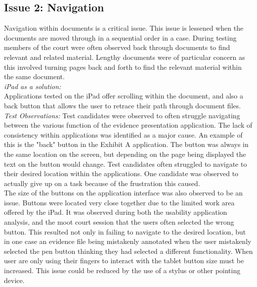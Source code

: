 \documentclass{article}
\begin{document}
\subsection{Issue 2: Navigation}
Navigation within documents is a critical issue. This issue is lessened when the documents are moved through in a sequential order in a case. During testing members of the court were often observed back through documents to find relevant and related material. Lengthy documents were of particular concern as this involved turning pages back and forth to find the relevant material within the same document.\\
\textit{iPad as a solution:}\\
Applications tested on the iPad offer scrolling within the document, and also a back button that allows the user to retrace their path through document files.\\
\textit{Test Observations:}
Test candidates were observed to often struggle navigating between the various function of the evidence presentation application. The lack of consistency within applications was identified as a major cause. An example of this is the "back" button in the Exhibit A application. The button was always in the same location on the screen, but depending on the page being displayed the text on the button would change. Test candidates often struggled to navigate to their desired location within the applications. One candidate was observed to actually give up on a task because of the frustration this caused. \\
The size of the buttons on the application interface was also observed to be an issue. Buttons were located very close together due to the limited work area offered by the iPad. It was observed during both the usability application analysis, and the moot court session that the users often selected the wrong button. This resulted not only in failing to navigate to the desired location, but in one case an evidence file being mistakenly annotated when the user mistakenly selected the pen button thinking they had selected a different functionality. When user are only using their fingers to interact with the tablet button size must be increased. This issue could be reduced by the use of a stylus or other pointing device.
\end{document}
